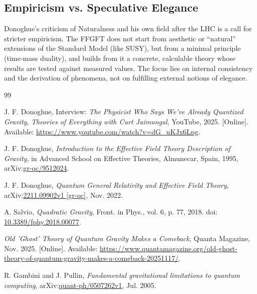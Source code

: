 	\subsection{Empiricism vs. Speculative Elegance}
	Donoghue's criticism of Naturalness and his own field after the LHC is a call for stricter empiricism. The FFGFT does not start from aesthetic or ``natural'' extensions of the Standard Model (like SUSY), but from a minimal principle (time-mass duality), and builds from it a concrete, calculable theory whose results are tested against measured values. The focus lies on internal consistency and the derivation of phenomena, not on fulfilling external notions of elegance.
		\begin{thebibliography}{99}
	
	J. F. Donoghue,
	Interview: \emph{The Physicist Who Says We've Already Quantized Gravity},
	\textit{Theories of Everything with Curt Jaimungal}, YouTube, 2025.
	[Online]. Available: \href{https://www.youtube.com/watch?v=dG_uKJx6Lpg}{https://www.youtube.com/watch?v=dG\_uKJx6Lpg}.
	
	J. F. Donoghue,
	\emph{Introduction to the Effective Field Theory Description of Gravity},
	in Advanced School on Effective Theories, Almunecar, Spain, 1995,
	arXiv:\href{https://arxiv.org/abs/gr-qc/9512024}{gr-qc/9512024}.
	
	J. F. Donoghue,
	\emph{Quantum General Relativity and Effective Field Theory},
	arXiv:\href{https://arxiv.org/abs/2211.09902}{2211.09902v1 [gr-qc]}, Nov. 2022.
	
	A. Salvio,
	\emph{Quadratic Gravity},
	Front. in Phys., vol. 6, p. 77, 2018.
	doi: \href{https://doi.org/10.3389/fphy.2018.00077}{10.3389/fphy.2018.00077}.
	
	\emph{Old 'Ghost' Theory of Quantum Gravity Makes a Comeback},
	Quanta Magazine, Nov. 2025.
	[Online]. Available: \href{https://www.quantamagazine.org/old-ghost-theory-of-quantum-gravity-makes-a-comeback-20251117/}{https://www.quantamagazine.org/old-ghost-theory-of-quantum-gravity-makes-a-comeback-20251117/}.
	
	R. Gambini and J. Pullin,
	\emph{Fundamental gravitational limitations to quantum computing},
	arXiv:\href{https://arxiv.org/abs/quant-ph/0507262}{quant-ph/0507262v1}, Jul. 2005.
	

\end{thebibliography}
